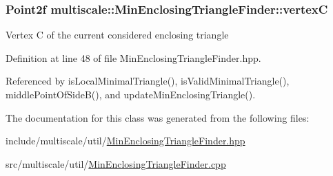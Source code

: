 \hypertarget{classmultiscale_1_1MinEnclosingTriangleFinder_a0fc6887251f73b19714f39888534cdaa}{
\subsubsection[{vertex\-C}]{\setlength{\rightskip}{0pt plus 5cm}Point2f multiscale\-::\-Min\-Enclosing\-Triangle\-Finder\-::vertex\-C\hspace{0.3cm}{\ttfamily [private]}}}\label{classmultiscale_1_1MinEnclosingTriangleFinder_a0fc6887251f73b19714f39888534cdaa}
Vertex C of the current considered enclosing triangle 

Definition at line 48 of file Min\-Enclosing\-Triangle\-Finder.\-hpp.



Referenced by is\-Local\-Minimal\-Triangle(), is\-Valid\-Minimal\-Triangle(), middle\-Point\-Of\-Side\-B(), and update\-Min\-Enclosing\-Triangle().



The documentation for this class was generated from the following files\-:\begin{DoxyCompactItemize}
\item 
include/multiscale/util/\hyperlink{MinEnclosingTriangleFinder_8hpp}{Min\-Enclosing\-Triangle\-Finder.\-hpp}\item 
src/multiscale/util/\hyperlink{MinEnclosingTriangleFinder_8cpp}{Min\-Enclosing\-Triangle\-Finder.\-cpp}\end{DoxyCompactItemize}
